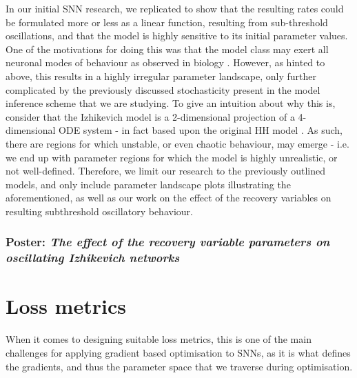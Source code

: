 \documentclass[mphil,deptreport,ianc]{infthesis} %
\begin{document}
In our initial SNN research, we replicated \cite{Oliveira2019} to show that the resulting rates could be formulated more or less as a linear function, resulting from sub-threshold oscillations, and that the model is highly sensitive to its initial parameter values.
One of the motivations for doing this was that the model class may exert all neuronal modes of behaviour as observed in biology \cite{Izhikevich2006}.
However, as hinted to above, this results in a highly irregular parameter landscape, only further complicated by the previously discussed stochasticity present in the model inference scheme that we are studying.
To give an intuition about why this is, consider that the Izhikevich model is a 2-dimensional projection of a 4-dimensional ODE system - in fact based upon the original HH model \cite{HH1952}.
As such, there are regions for which unstable, or even chaotic behaviour, may emerge - i.e. we end up with parameter regions for which the model is highly unrealistic, or not well-defined.
Therefore, we limit our research to the previously outlined models, and only include parameter landscape plots illustrating the aforementioned, as well as our work on the effect of the recovery variables on resulting subthreshold oscillatory behaviour.



\subsubsection{Poster: \textit{The effect of the recovery variable parameters on oscillating Izhikevich networks}}\label{section:izhikevich}



\section{Loss metrics}


When it comes to designing suitable loss metrics, this is one of the main challenges for applying gradient based optimisation to SNNs, as it is what defines the gradients, and thus the parameter space that we traverse during optimisation.
\end{document}
